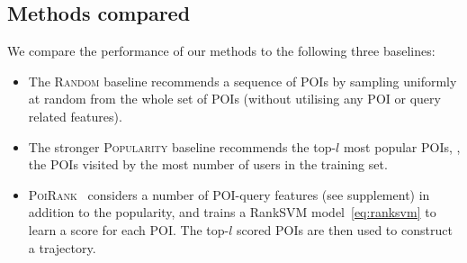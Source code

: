 

\secmoveup
\subsection{Methods compared}
\label{ssec:methods}
\textmoveup

We compare the performance of our methods to the following three baselines:
\begin{itemize}[leftmargin=0.125in]\itemmoveup
\parskip -.05em
\item The \textsc{Random} baseline recommends a sequence of POIs by sampling uniformly at random from the whole set of POIs 
      (without utilising any POI or query related features).

\item The stronger \textsc{Popularity} baseline recommends the top-$l$ most popular POIs, 
      \ie, the POIs visited by the most number of users in the training set.

\item \textsc{PoiRank}~\cite{cikm16paper} 
      considers a number of POI-query features (see supplement) in addition to the popularity,
      and trains a RankSVM model~\eqref{eq:ranksvm} to learn a score for each POI. The top-$l$ scored POIs are then used to construct a trajectory.
\end{itemize}\itemmoveup

